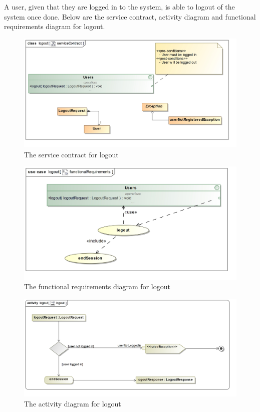 A user, given that they are logged in to the system, is able to logout of the system once done. Below are the service contract, activity diagram and functional requirements diagram for logout.

\begin{figure}[H]
	\centering
	\includegraphics[width=1.2\textwidth]{../images/funcReq/logoutServiceContract.jpg}
	\caption{The service contract for logout \label{overflow}}
\end{figure}

\begin{figure}[H]
	\centering
	\includegraphics[width=1.1\textwidth]{../images/funcReq/logoutFunctionalRequirements.jpg}
	\caption{The functional requirements diagram for logout \label{overflow}}
\end{figure}

\begin{figure}[H]
	\centering
	\includegraphics[scale=0.22]{../images/funcReq/logoutActivityDiagram.jpg}
	\caption{The activity diagram for logout \label{overflow}}
\end{figure}

